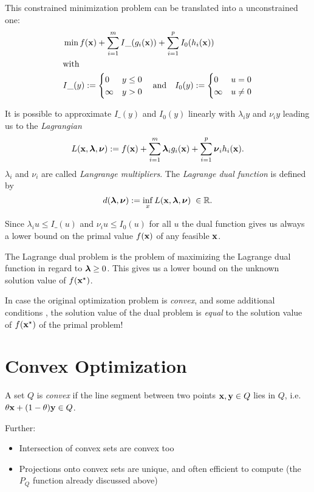 This constrained minimization problem can be translated into a unconstrained one:
\begin{eqnarray*}
&\min f(\boldsymbol{\mathrm{x}}) + \sum_{i=1}^m I\_(g_i(\boldsymbol{\mathrm{x}})) + \sum_{i=1}^p I_0(h_i(\boldsymbol{\mathrm{x}}))\\
&\text{with}\\
&I\_(y) := \begin{cases} 0 & y \leq 0\\ \infty & y > 0 \end{cases} \quad\text{and}\quad
I_0(y) := \begin{cases} 0 & u = 0\\ \infty & u \neq 0 \end{cases}
\end{eqnarray*}

It is possible  to approximate \(I\_(y)\) and \(I_0(y)\) linearly with \(\lambda_i y\) and \(\nu_i y\) leading us to the \emph{Lagrangian}
\[
L(\boldsymbol{\mathrm{x}}, \boldsymbol{\mathrm{\lambda}}, \boldsymbol{\mathrm{\nu}}) := f(\boldsymbol{\mathrm{x}}) + \sum_{i = 1}^m \boldsymbol{\mathrm{\lambda}}_i g_i(\boldsymbol{\mathrm{x}}) + \sum_{i = 1}^p \boldsymbol{\mathrm{\nu}}_i h_i(\boldsymbol{\mathrm{x}}).
\]
\(\lambda_i\) and \(\nu_i\) are called \emph{Langrange multipliers}. The \emph{Lagrange dual function} is defined by
\[
d(\boldsymbol{\mathrm{\lambda}}, \boldsymbol{\mathrm{\nu}}) := \inf_{x} L(\boldsymbol{\mathrm{x}}, \boldsymbol{\mathrm{\lambda}}, \boldsymbol{\mathrm{\nu}}) \; \in \mathbb{R}.
\]

Since \(\lambda_i u \leq I\_(u)\) and \(\nu_i u \leq I_0(u)\) for all \(u\) the dual function gives us always a lower bound on the primal value \(f(\boldsymbol{\mathrm{x}})\) of any feasible \(\boldsymbol{\mathrm{x}}\).

\begin{definition}
The Lagrange dual problem is the problem of maximizing the Lagrange dual function in regard to \(\boldsymbol{\mathrm{\lambda}} \geq 0\). This gives us a lower bound on the unknown solution value of \(f(\boldsymbol{\mathrm{x}}^\star)\).

In case the original optimization problem is \emph{convex}, and some additional conditions , the solution value of the dual problem is \emph{equal} to the solution value of \(f(\boldsymbol{\mathrm{x}}^\star)\) of the primal problem!
\end{definition}

\section{Convex Optimization}
\begin{definition}
A set \(Q\) is \emph{convex} if the line segment between two points \(\boldsymbol{\mathrm{x}}, \boldsymbol{\mathrm{y}} \in Q\) lies in \(Q\), i.e. \(\theta \boldsymbol{\mathrm{x}} + (1-\theta) \boldsymbol{\mathrm{y}} \in Q\).

Further:
\begin{itemize}
\item Intersection of convex sets are convex too
\item Projections onto convex sets are unique, and often efficient to compute (the \(P_Q\) function already discussed above)
\end{itemize}
\end{definition}

